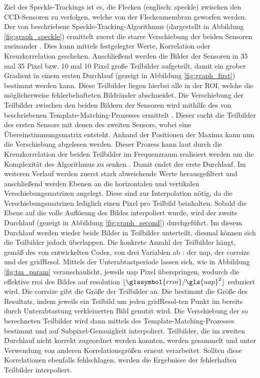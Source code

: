 Ziel des Speckle-Trackings ist es, die Flecken (englisch: speckle) zwischen den \gls{CCD}-Sensoren zu verfolgen, welche von der Fleckenmembran geworfen werden. Der von \citeauthor{Ber13} beschriebene Speckle-Tracking-Algorithmus (dargestellt in Abbildung \ref{fig:graph_speckle}) ermittelt zuerst die starre Verschiebung der beiden Sensoren zueinander . Dies kann mittels festgelegter Werte, Korrelation oder Kreuzkorrelation geschehen. Anschließend werden die Bilder der Sensoren in 35 mal 35 Pixel bzw. 10 mal 10 Pixel große Teilbilder aufgeteilt, damit ein grober Gradient in einem ersten Durchlauf (gezeigt in Abbildung \ref{fig:graph_first}) bestimmt werden kann. Diese Teilbilder liegen hierbei alle in der \gls{ROI}, welche die möglicherweise fehlerbehafteten Bildränder abschneidet. Die Verschiebung der Teilbilder zwischen den beiden Bildern der Sensoren wird mithilfe des von \citeauthor{Lew94} beschriebenen Template-Matching-Prozesses ermittelt \cite{Lew94}. Dieser sucht die Teilbilder des ersten Sensors mit denen des zweiten Sensors, wobei eine Übereinstimmungsmatrix entsteht. Anhand der Positionen der Maxima kann nun die Verschiebung abgelesen werden. Dieser Prozess kann laut \citeauthor{Lew94} durch die Kreuzkorrelation der beiden Teilbilder im Frequenzraum realisiert werden um die Komplexität des Algorithmus zu senken \cite{Lew94}. Damit endet der erste Durchlauf. Im weiteren Verlauf werden zuerst stark abweichende Werte herausgefiltert und anschließend werden Ebenen an die horizontalen und vertikalen Verschiebungsmatrizen angelegt. Diese sind zur Interpolation nötig, da die Verschiebungsmatrizen lediglich einen Pixel pro Teilbild beinhalten. Sobald die Ebene auf die volle Auflösung des Bildes interpoliert wurde, wird der zweite Durchlauf (gezeigt in Abbildung \ref{fig:graph_second}) durchgeführt. Im diesem Durchlauf werden wieder beide Bilder in Teilbilder unterteilt, diesmal können sich die Teilbilder jedoch überlappen. Die konkrete Anzahl der Teilbilder hängt, gemäß des von \citeauthor{Coj17} entwickelten Codes, von drei Variablen ab \cite{Coj17}: der \gls{uap}, der \gls{corrsize} und der \gls{gridResol}. Mittels der Unterabtastperiode lassen sich, wie in Abbildung \ref{fig:tm_param} veranschaulicht, jeweils \gls{uap} Pixel überspringen, wodurch die effektive \gls{rroi} des Bildes auf \glsdesc{resolution} $\lfloor\glssymbol{rroi}/\gls{uap}^2\rfloor$ reduziert wird. Die  \gls{corrsize} gibt die Größe der Teilbilder an. Die  bestimmt die Größe des Resultats, indem jeweils ein Teilbild um jeden \gls{gridResol}-ten Punkt im bereits durch Unterabtastung verkleinerten Bild genutzt wird. Die Verschiebung der so berechneten Teilbilder wird dann mittels des Template-Matching-Prozesses bestimmt und auf Subpixel-Genauigkeit interpoliert. Teilbilder, die im zweiten Durchlauf nicht korrekt zugeordnet werden konnten, werden gesammelt und unter Verwendung von anderen Korrelationsgrößen erneut verarbeitet. Sollten diese Korrelationen ebenfalls fehlschlagen, werden die Ergebnisse der fehlerhaften Teilbilder interpoliert. 

